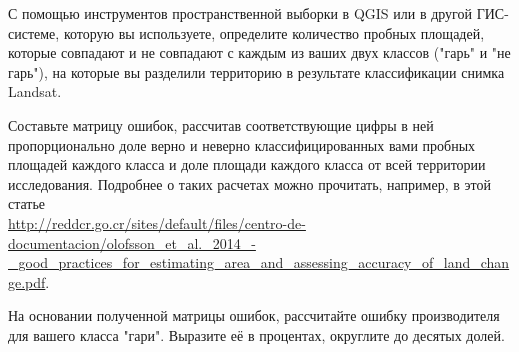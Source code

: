 
С помощью инструментов пространственной выборки в QGIS или в другой ГИС-системе, которую вы используете, определите количество пробных площадей, которые совпадают и не совпадают с каждым из ваших двух классов ("гарь" и "не гарь"), на которые вы разделили территорию в результате классификации снимка Landsat.

Составьте матрицу ошибок, рассчитав соответствующие цифры в ней пропорционально доле верно и неверно классифицированных вами пробных площадей каждого класса и доле площади каждого класса от всей территории исследования. Подробнее о таких расчетах можно прочитать, например, в этой статье\\ \url{http://reddcr.go.cr/sites/default/files/centro-de-documentacion/olofsson_et_al._2014_-_good_practices_for_estimating_area_and_assessing_accuracy_of_land_change.pdf}.

На основании полученной матрицы ошибок, рассчитайте ошибку производителя для вашего класса "гари". Выразите её в процентах, округлите до десятых долей.